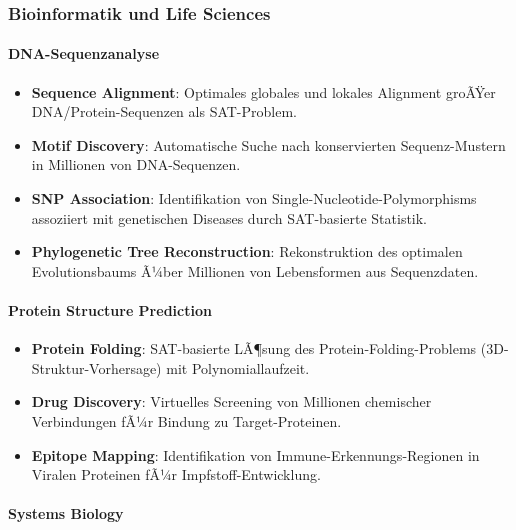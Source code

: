 ﻿\documentclass[a4paper,12pt]{article}
\theoremstyle{definition}
\begin{document}
\subsubsection{Bioinformatik und Life Sciences}

\paragraph{DNA-Sequenzanalyse}

\begin{itemize}
	\item \textbf{Sequence Alignment}: Optimales globales und lokales Alignment groÃŸer DNA/Protein-Sequenzen als SAT-Problem.
	
	\item \textbf{Motif Discovery}: Automatische Suche nach konservierten Sequenz-Mustern in Millionen von DNA-Sequenzen.
	
	\item \textbf{SNP Association}: Identifikation von Single-Nucleotide-Polymorphisms assoziiert mit genetischen Diseases durch SAT-basierte Statistik.
	
	\item \textbf{Phylogenetic Tree Reconstruction}: Rekonstruktion des optimalen Evolutionsbaums Ã¼ber Millionen von Lebensformen aus Sequenzdaten.
\end{itemize}

\paragraph{Protein Structure Prediction}

\begin{itemize}
	\item \textbf{Protein Folding}: SAT-basierte LÃ¶sung des Protein-Folding-Problems (3D-Struktur-Vorhersage) mit Polynomiallaufzeit.
	
	\item \textbf{Drug Discovery}: Virtuelles Screening von Millionen chemischer Verbindungen fÃ¼r Bindung zu Target-Proteinen.
	
	\item \textbf{Epitope Mapping}: Identifikation von Immune-Erkennungs-Regionen in Viralen Proteinen fÃ¼r Impfstoff-Entwicklung.
\end{itemize}

\paragraph{Systems Biology}
\end{document}
